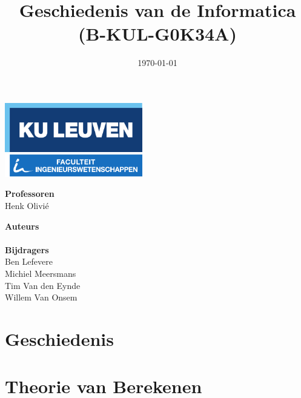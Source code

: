 \documentclass[11pt]{article}
\title{Geschiedenis van de Informatica \\ (B-KUL-G0K34A)}
\date{\today}
\author{\theauthors}
\newcommand{\thecontributors}{Ben Lefevere \\ Michiel Meersmans \\ Tim Van den Eynde \\  Willem Van Onsem }
\newcommand{\theprofs}{Henk Olivi\'e}
\theoremstyle{definition}
\begin{document}

\begin{titlepage}

\thispagestyle{empty}

\begin{minipage}{\textwidth}
	\includegraphics[width=60mm]{logokuleng.pdf}
\end{minipage}

\vspace{40mm}

\begin{minipage}{\textwidth}
	\Huge
	\sffamily
	\thetitle
\end{minipage}

\vspace{50mm}

\hfill
\begin{minipage}[t]{0.5\textwidth}
	\Large
	\sffamily
	\textbf{Professoren} \\
	\theprofs
\end{minipage}%
\begin{minipage}[t]{0.5\textwidth}
\begin{flushright}
	\Large
	\sffamily
	\textbf{Auteurs} \\
	\theauthor
	\vspace{10mm} \\
	\textbf{Bijdragers} \\
	\thecontributors
\end{flushright}
\end{minipage}
\vfill
\end{titlepage}

\newpage

\tableofcontents

\newpage

\section{Geschiedenis}



\newpage

\section{Theorie van Berekenen}

\newpage
\end{document}
